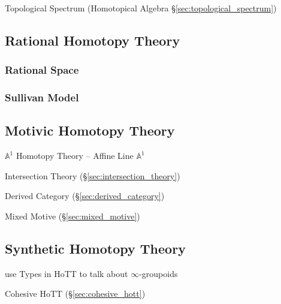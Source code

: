 Topological Spectrum (Homotopical Algebra \S\ref{sec:topological_spectrum})



\subsection{Rational Homotopy Theory}\label{sec:rational_homotopy}

\subsubsection{Rational Space}\label{sec:rational_space}

\subsubsection{Sullivan Model}\label{sec:sullivan_model}



\subsection{Motivic Homotopy Theory}\label{sec:motivic_homotopy}

$\mathbb{A}^1$ Homotopy Theory -- Affine Line $\mathbb{A}^1$

\fist Intersection Theory (\S\ref{sec:intersection_theory})

Derived Category (\S\ref{sec:derived_category})

Mixed Motive (\S\ref{sec:mixed_motive})



\subsection{Synthetic Homotopy Theory}\label{sec:synthetic_homotopy_theory}

use Types in HoTT to talk about $\infty$-groupoids

\fist Cohesive HoTT (\S\ref{sec:cohesive_hott})

